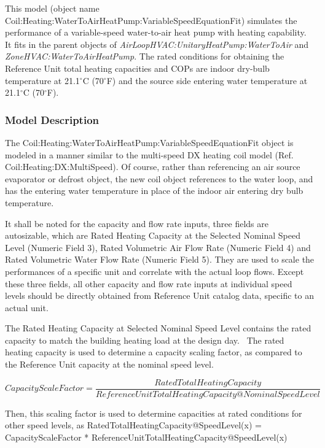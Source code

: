 This model (object name Coil:Heating:WaterToAirHeatPump:VariableSpeedEquationFit) simulates the performance of a variable-speed water-to-air heat pump with heating capability. It fits in the parent objects of \emph{AirLoopHVAC:UnitaryHeatPump:WaterToAir} and \emph{ZoneHVAC:WaterToAirHeatPump}. The rated conditions for obtaining the Reference Unit total heating capacities and COPs are indoor dry-bulb temperature at 21.1\(^{\circ}\)C (70\(^{\circ}\)F) and the source side entering water temperature at 21.1\(^{\circ}\)C (70\(^{\circ}\)F).

\subsubsection{Model Description}\label{model-description-10}

The Coil:Heating:WaterToAirHeatPump:VariableSpeedEquationFit object is modeled in a manner similar to the multi-speed DX heating coil model (Ref. Coil:Heating:DX:MultiSpeed). Of course, rather than referencing an air source evaporator or defrost object, the new coil object references to the water loop, and has the entering water temperature in place of the indoor air entering dry bulb temperature.

It shall be noted for the capacity and flow rate inputs, three fields are autosizable, which are Rated Heating Capacity at the Selected Nominal Speed Level (Numeric Field 3), Rated Volumetric Air Flow Rate (Numeric Field 4) and Rated Volumetric Water Flow Rate (Numeric Field 5). They are used to scale the performances of a specific unit and correlate with the actual loop flows. Except these three fields, all other capacity and flow rate inputs at individual speed levels should be directly obtained from Reference Unit catalog data, specific to an actual unit.

The Rated Heating Capacity at Selected Nominal Speed Level contains the rated capacity to match the building heating load at the design day.~ The rated heating capacity is used to determine a capacity scaling factor, as compared to the Reference Unit capacity at the nominal speed level.

{\scriptsize
\begin{equation}
CapacityScaleFactor = \frac{{RatedTotalHeatingCapacity}}{{ReferenceUnitTotalHeatingCapacity@NominalSpeedLevel}}
\end{equation}}

Then, this scaling factor is used to determine capacities at rated conditions for other speed levels, as RatedTotalHeatingCapacity@SpeedLevel(x) = CapacityScaleFactor * ReferenceUnitTotalHeatingCapacity@SpeedLevel(x)

